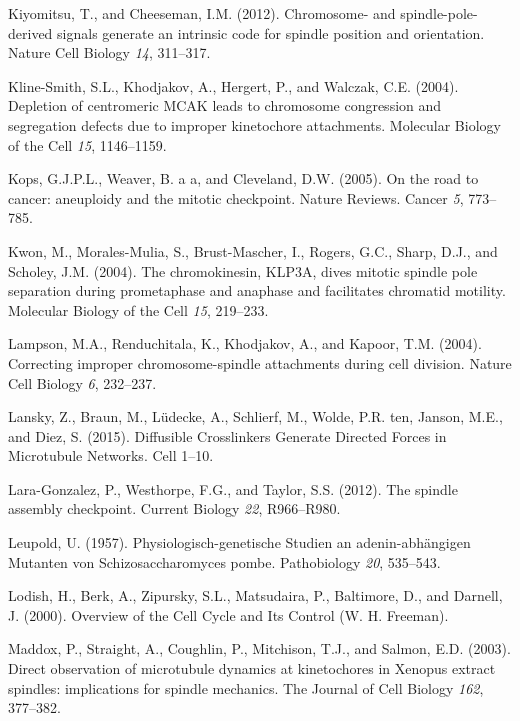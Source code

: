 \documentclass[12pt,a4paper,twoside,openright]{book}
\begin{document}
\hypertarget{ref-Kiyomitsu2012}{}
Kiyomitsu, T., and Cheeseman, I.M. (2012). Chromosome- and
spindle-pole-derived signals generate an intrinsic code for spindle
position and orientation. Nature Cell Biology \emph{14}, 311--317.

\hypertarget{ref-Kline-Smith2004}{}
Kline-Smith, S.L., Khodjakov, A., Hergert, P., and Walczak, C.E. (2004).
Depletion of centromeric MCAK leads to chromosome congression and
segregation defects due to improper kinetochore attachments. Molecular
Biology of the Cell \emph{15}, 1146--1159.

\hypertarget{ref-Kops2005}{}
Kops, G.J.P.L., Weaver, B. a a, and Cleveland, D.W. (2005). On the road
to cancer: aneuploidy and the mitotic checkpoint. Nature Reviews. Cancer
\emph{5}, 773--785.

\hypertarget{ref-Kwon2004}{}
Kwon, M., Morales-Mulia, S., Brust-Mascher, I., Rogers, G.C., Sharp,
D.J., and Scholey, J.M. (2004). The chromokinesin, KLP3A, dives mitotic
spindle pole separation during prometaphase and anaphase and facilitates
chromatid motility. Molecular Biology of the Cell \emph{15}, 219--233.

\hypertarget{ref-Lampson2004}{}
Lampson, M.A., Renduchitala, K., Khodjakov, A., and Kapoor, T.M. (2004).
Correcting improper chromosome-spindle attachments during cell division.
Nature Cell Biology \emph{6}, 232--237.

\hypertarget{ref-Lansky2015}{}
Lansky, Z., Braun, M., Lüdecke, A., Schlierf, M., Wolde, P.R. ten,
Janson, M.E., and Diez, S. (2015). Diffusible Crosslinkers Generate
Directed Forces in Microtubule Networks. Cell 1--10.

\hypertarget{ref-Lara-Gonzalez2012}{}
Lara-Gonzalez, P., Westhorpe, F.G., and Taylor, S.S. (2012). The spindle
assembly checkpoint. Current Biology \emph{22}, R966--R980.

\hypertarget{ref-Leupold1957}{}
Leupold, U. (1957). Physiologisch-genetische Studien an
adenin-abhängigen Mutanten von Schizosaccharomyces pombe. Pathobiology
\emph{20}, 535--543.

\hypertarget{ref-Lodish2000}{}
Lodish, H., Berk, A., Zipursky, S.L., Matsudaira, P., Baltimore, D., and
Darnell, J. (2000). Overview of the Cell Cycle and Its Control (W. H.
Freeman).

\hypertarget{ref-Maddox2003}{}
Maddox, P., Straight, A., Coughlin, P., Mitchison, T.J., and Salmon,
E.D. (2003). Direct observation of microtubule dynamics at kinetochores
in Xenopus extract spindles: implications for spindle mechanics. The
Journal of Cell Biology \emph{162}, 377--382.
\end{document}
